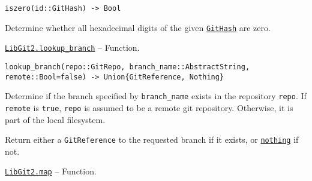 \begin{adjustwidth}{2em}{0pt}


\begin{verbatim}
iszero(id::GitHash) -> Bool
\end{verbatim}

Determine whether all hexadecimal digits of the given \hyperlink{202290709580230708}{\texttt{GitHash}} are zero.



\end{adjustwidth}
\hypertarget{8872141007246166845}{} 
\hyperlink{8872141007246166845}{\texttt{LibGit2.lookup\_branch}}  -- {Function.}

\begin{adjustwidth}{2em}{0pt}


\begin{verbatim}
lookup_branch(repo::GitRepo, branch_name::AbstractString, remote::Bool=false) -> Union{GitReference, Nothing}
\end{verbatim}

Determine if the branch specified by \texttt{branch\_name} exists in the repository \texttt{repo}. If \texttt{remote} is \texttt{true}, \texttt{repo} is assumed to be a remote git repository. Otherwise, it is part of the local filesystem.

Return either a \texttt{GitReference} to the requested branch if it exists, or \hyperlink{9331422207248206047}{\texttt{nothing}} if not.



\end{adjustwidth}
\hypertarget{546421066875217314}{} 
\hyperlink{546421066875217314}{\texttt{LibGit2.map}}  -- {Function.}

